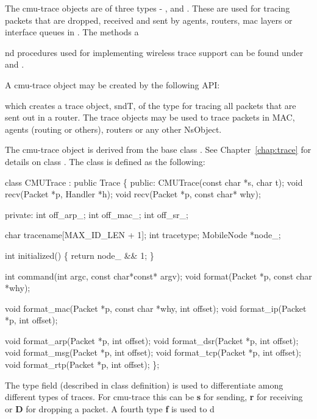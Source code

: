 The cmu-trace objects are of three types - ,  and . These are used for tracing packets that are dropped, received and sent by agents, routers, mac layers or interface queues in \ns. The methods a











nd procedures used for implementing wireless trace support can be found under  and .

A cmu-trace object may be created by the following API:

which creates a trace object, sndT, of the type  for tracing all packets that are sent out in a router. The trace objects may be used to trace packets in MAC, agents (routing or others), routers or any other NsObject. 

The cmu-trace object  is derived from the base class . See Chapter~\ref{chap:trace} for details on class . The class  is defined as the following:

\begin{program}
class CMUTrace : public Trace \{
public:
	CMUTrace(const char *s, char t);
	void	recv(Packet *p, Handler *h);
	void	recv(Packet *p, const char* why);

private:
	int off_arp_;
	int off_mac_;
	int off_sr_;

	char	tracename[MAX_ID_LEN + 1];
        int     tracetype;
        MobileNode *node_;

        int initialized() \{ return node_ && 1; \}

	int	command(int argc, const char*const* argv);
	void	format(Packet *p, const char *why);

	void	format_mac(Packet *p, const char *why, int offset);
	void	format_ip(Packet *p, int offset);

	void	format_arp(Packet *p, int offset);
	void	format_dsr(Packet *p, int offset);
	void	format_msg(Packet *p, int offset);
	void	format_tcp(Packet *p, int offset);
	void	format_rtp(Packet *p, int offset);
\};
\end{program}

The type field (described in  class definition) is used to differentiate among different types of traces. For cmu-trace this can be {\bf s} for sending, {\bf r} for receiving or {\bf D} for dropping a packet. A fourth type {\bf f} is used to d











